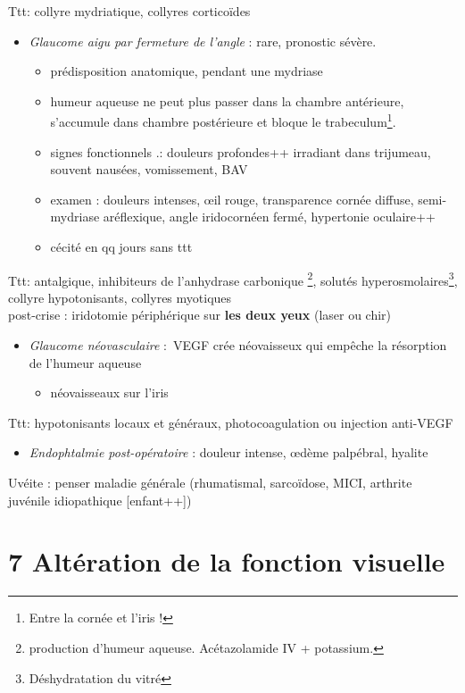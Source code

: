 \documentclass[11pt]{article}
\def\ttt{\hspace*{1cm}Ttt: }
\begin{document}
\ttt collyre mydriatique, collyres corticoïdes
\begin{itemize}
\item \emph{Glaucome aigu par fermeture de l'angle} : rare, pronostic sévère.
\begin{itemize}
\item prédisposition anatomique, pendant une mydriase
\item humeur aqueuse ne peut plus passer dans la chambre antérieure, s'accumule
dans chambre postérieure et bloque le trabeculum\footnote{Entre la cornée et l'iris !}.
\item signes fonctionnels .: douleurs profondes++ irradiant dans trijumeau,
souvent nausées, vomissement, BAV
\item examen : douleurs intenses, \oe{}il rouge, transparence cornée \dec diffuse,
semi-mydriase aréflexique, angle iridocornéen fermé, hypertonie oculaire++
\item cécité en qq jours sans ttt \danger
\end{itemize}
\end{itemize}
\ttt antalgique, inhibiteurs de l'anhydrase carbonique \footnote{\dec production d'humeur aqueuse. Acétazolamide IV + potassium.}\faBomb, solutés hyperosmolaires\footnote{Déshydratation du vitré}, collyre hypotonisants,
    collyres myotiques\\
  post-crise : iridotomie périphérique sur \textbf{les deux yeux} (laser ou chir)
\begin{itemize}
\item \emph{Glaucome néovasculaire} : VEGF crée néovaisseux qui empêche la résorption de
l'humeur aqueuse
\begin{itemize}
\item néovaisseaux sur l'iris
\end{itemize}
\end{itemize}
\ttt hypotonisants locaux et généraux, photocoagulation ou injection anti-VEGF
\begin{itemize}
\item \emph{Endophtalmie post-opératoire} : douleur intense, \oe{}dème palpébral, hyalite
\end{itemize}

\begin{tcolorbox}
Uvéite : penser maladie générale (rhumatismal, sarcoïdose, MICI, arthrite juvénile idiopathique [enfant++])
\end{tcolorbox}

\section{7 Altération de la fonction visuelle}
\label{sec:orga7c5003}
\end{document}
